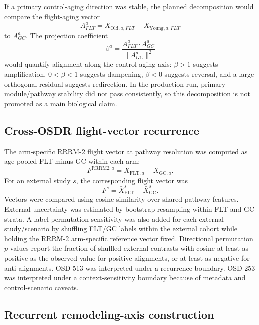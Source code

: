 \documentclass[11pt]{article}
\begin{document}
If a primary control-aging direction was stable, the planned decomposition would compare the flight-aging vector
\begin{equation}
A^a_{FLT}=\bar{X}_{\mathrm{Old},a,FLT}-\bar{X}_{\mathrm{Young},a,FLT}
\end{equation}
to $A^a_{GC}$. The projection coefficient
\begin{equation}
\beta^a = \frac{A^a_{FLT}\cdot A^a_{GC}}{\lVert A^a_{GC}\rVert^2}
\end{equation}
would quantify alignment along the control-aging axis: $\beta>1$ suggests amplification, $0<\beta<1$ suggests dampening, $\beta<0$ suggests reversal, and a large orthogonal residual suggests redirection. In the production run, primary module/pathway stability did not pass consistently, so this decomposition is not promoted as a main biological claim.

\subsection{Cross-OSDR flight-vector recurrence}

The arm-specific RRRM-2 flight vector at pathway resolution was computed as age-pooled FLT minus GC within each arm:
\begin{equation}
F^{\mathrm{RRRM2},a}=\bar{X}_{\mathrm{FLT},a}-\bar{X}_{\mathrm{GC},a}.
\end{equation}
For an external study $s$, the corresponding flight vector was
\begin{equation}
F^s=\bar{X}^s_{\mathrm{FLT}}-\bar{X}^s_{\mathrm{GC}}.
\end{equation}
Vectors were compared using cosine similarity over shared pathway features. External uncertainty was estimated by bootstrap resampling within FLT and GC strata. A label-permutation sensitivity was also added for each external study/scenario by shuffling FLT/GC labels within the external cohort while holding the RRRM-2 arm-specific reference vector fixed. Directional permutation $p$ values report the fraction of shuffled external contrasts with cosine at least as positive as the observed value for positive alignments, or at least as negative for anti-alignments. OSD-513 was interpreted under a recurrence boundary. OSD-253 was interpreted under a context-sensitivity boundary because of metadata and control-scenario caveats.

\subsection{Recurrent remodeling-axis construction}
\end{document}
